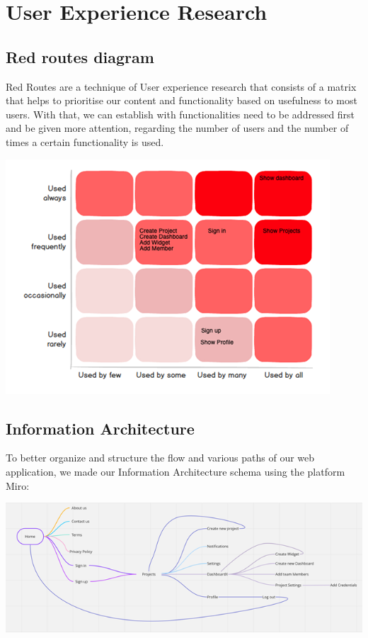 \documentclass[a4paper,twoside,10pt]{report}
\begin{document}
\chapter{User Experience Research}

\section{Red routes diagram}
Red Routes are a technique of User experience research that consists of a matrix that helps to prioritise our content and functionality based on usefulness to most users. With that, we can establish with functionalities need to be addressed first and be given more attention, regarding the number of users and the number of times a certain functionality is used.
\\ \newline
\begin{center}
    \includegraphics[width=\textwidth]{red-routes-diagram.png}
\end{center}
\newpage

\section{Information Architecture}
To better organize and structure the flow and various paths of our web application, we made our Information Architecture schema using the platform Miro:
\\ \newline
\begin{center}
    \includegraphics[width=\textwidth]{information-architecture.png}
\end{center}
\end{document}
